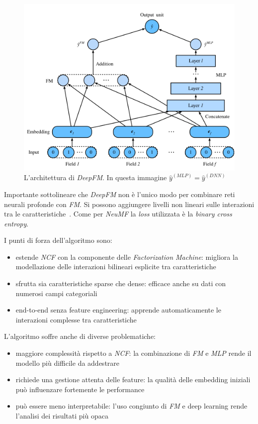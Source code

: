 \begin{figure}[htbp]
    \centering
    \includegraphics[scale=0.5]{figures/algorithms/deepfm.png}
    \caption{L'architettura di \textit{DeepFM}. In questa immagine $\hat{y}^{(MLP)} = \hat{y}^{(DNN)}$}
    \label{fig:deepfm}
\end{figure}

Importante sottolineare che \textit{DeepFM} non è l'unico modo per combinare reti neurali profonde con \textit{FM}. Si possono aggiungere livelli non lineari sulle interazioni tra le caratteristiche~\cite{NFA_SPA}. Come per \textit{NeuMF} la \textit{loss} utilizzata è la \textit{binary cross entropy}.

I punti di forza dell'algoritmo sono:

\begin{itemize}
  \item estende \textit{NCF} con la componente delle \textit{Factorization Machine}: migliora la modellazione delle interazioni bilineari esplicite tra caratteristiche
  \item sfrutta sia caratteristiche sparse che dense: efficace anche su dati con numerosi campi categoriali
  \item end-to-end senza feature engineering: apprende automaticamente le interazioni complesse tra caratteristiche
\end{itemize}

L'algoritmo soffre anche di diverse problematiche:

\begin{itemize}
  \item maggiore complessità rispetto a \textit{NCF}: la combinazione di \textit{FM} e \textit{MLP} rende il modello più difficile da addestrare
  \item richiede una gestione attenta delle feature: la qualità delle embedding iniziali può influenzare fortemente le performance
  \item può essere meno interpretabile: l'uso congiunto di \textit{FM} e deep learning rende l'analisi dei risultati più opaca
\end{itemize}

